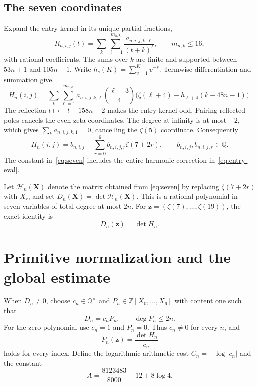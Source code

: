 \documentclass[11pt]{article}
\newcommand{\Q}{\mathbb Q}
\newcommand{\Z}{\mathbb Z}
\begin{document}
\subsection{The seven coordinates}
Expand the entry kernel in its unique partial fractions,
\begin{equation}\label{eq:pf}
R_{n,i,j}(t)=\sum_k\sum_{\ell=1}^{m_{n,k}}
 \frac{a_{n,i,j,k,\ell}}{(t+k)^\ell},\qquad m_{n,k}\leq16,
\end{equation}
with rational coefficients. The sums over $k$ are finite and supported
between $53n+1$ and $105n+1$. Write
$h_s(K)=\sum_{v=1}^{K}v^{-s}$. Termwise differentiation and summation give
\begin{equation}\label{eq:entry-eval}
H_n(i,j)=\sum_k\sum_{\ell=1}^{m_{n,k}}
 a_{n,i,j,k,\ell}\binom{\ell+3}{4}
 \bigl(\zeta(\ell+4)-h_{\ell+4}(k-48n-1)\bigr).
\end{equation}
The reflection $t\mapsto-t-158n-2$ makes the entry kernel odd. Pairing
reflected poles cancels the even zeta coordinates. The degree at infinity
is at most $-2$, which gives
$\sum_k a_{n,i,j,k,1}=0$, cancelling the $\zeta(5)$ coordinate. Consequently
\begin{equation}\label{eq:seven}
H_n(i,j)=b_{n,i,j}+\sum_{r=0}^{6}b_{n,i,j,r}\zeta(7+2r),
\qquad b_{n,i,j},b_{n,i,j,r}\in\Q.
\end{equation}
The constant in~\eqref{eq:seven} includes the entire harmonic correction
in~\eqref{eq:entry-eval}.

Let $\mathcal H_n(\mathbf X)$ denote the matrix obtained from
\eqref{eq:seven} by replacing $\zeta(7+2r)$ with $X_r$, and set
$D_n(\mathbf X)=\det\mathcal H_n(\mathbf X)$. This is a rational polynomial
in seven variables of total degree at most $2n$. For
$\mathbf z=(\zeta(7),\ldots,\zeta(19))$, the exact identity is
\begin{equation}\label{eq:det-eval}
D_n(\mathbf z)=\det H_n.
\end{equation}

\section{Primitive normalization and the global estimate}\label{sec:rates}
When $D_n\ne0$, choose $c_n\in\Q^\times$ and
$P_n\in\Z[X_0,\ldots,X_6]$ with content one such that
\begin{equation}\label{eq:normalization}
D_n=c_nP_n,\qquad \deg P_n\leq2n.
\end{equation}
For the zero polynomial use $c_n=1$ and $P_n=0$. Thus $c_n\ne0$ for every
$n$, and
\begin{equation}\label{eq:same-object}
P_n(\mathbf z)=\frac{\det H_n}{c_n}
\end{equation}
holds for every index. Define the logarithmic arithmetic cost
$C_n=-\log|c_n|$ and the constant
\begin{equation}\label{eq:analytic-constant}
A=\frac{8123483}{8000}-12+8\log4.
\end{equation}
\end{document}
